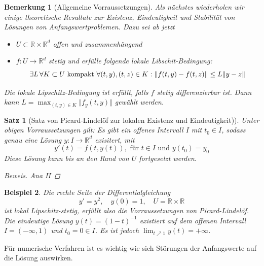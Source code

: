 \documentclass[12pt]{article}
\theoremstyle{break}
\newtheorem{theorem}{Satz}[subsection]
\newtheorem*{comment*}{Bemerkung}
\newtheorem{example}[theorem]{Beispiel}
\begin{document}
\begin{comment*}[Allgemeine Vorraussetzungen]
Als nächstes wiederholen wir einige theoretische Resultate zur Existenz, Eindeutigkeit und Stabilität von Lösungen von Anfangswertproblemen. Dazu sei ab jetzt
\begin{itemize}
  \item $U \subset \mathbb{R} \times \mathbb{R}^d$ offen und zusammenhängend
  \item $f: U \rightarrow \mathbb{R}^d$ stetig und erfülle folgende lokale Libschit-Bedingung:
  $$\exists L \thinspace \forall K \subset U \text{ kompakt } \forall (t, y), (t,z) \in K: \Vert f(t, y) - f(t,z) \Vert \leq L \Vert y- z \Vert$$
\end{itemize}
Die lokale Lipschitz-Bedingung ist erfüllt, falls $f$ stetig differenzierbar ist. Dann kann $L = \max_{(t, y) \in K} \Vert f_y(t, y) \Vert$ gewählt werden. 
\end{comment*}

\begin{theorem}[Satz von Picard-Lindelöf zur lokalen Existenz und Eindeutigkeit)]
Unter obigen Vorraussetzungen gilt: Es gibt ein offenes Intervall $I$ mit $t_0 \in I$, sodass genau eine Lösung $y: I \rightarrow \mathbb{R}^d$ exisitert, mit
$$y'(t) = f(t, y(t)), \text{ für $t\in I$ und $y(t_0)=y_0$}$$
Diese Lösung kann bis an den Rand von $U$ fortgesetzt werden.
\begin{proof}[Beweis] Ana II \end{proof}
\end{theorem}

\begin{example}
Die rechte Seite der Differentialgleichung
$$y' = y^2, \quad y(0) = 1, \quad U = \mathbb{R} \times \mathbb{R}$$
ist lokal Lipschitz-stetig, erfüllt also die Vorraussetzungen von Picard-Lindelöf. Die eindeutige Lösung $y(t) = (1-t)^{-1}$ existiert auf dem offenen Intervall $I = (-\infty, 1)$ und $t_0 = 0 \in I$. Es ist jedoch $\lim_{t \nearrow 1} y(t) = + \infty$. 
\end{example}

Für numerische Verfahren ist es wichtig wie sich Störungen der Anfangswerte auf die Lösung auswirken.
\end{document}
